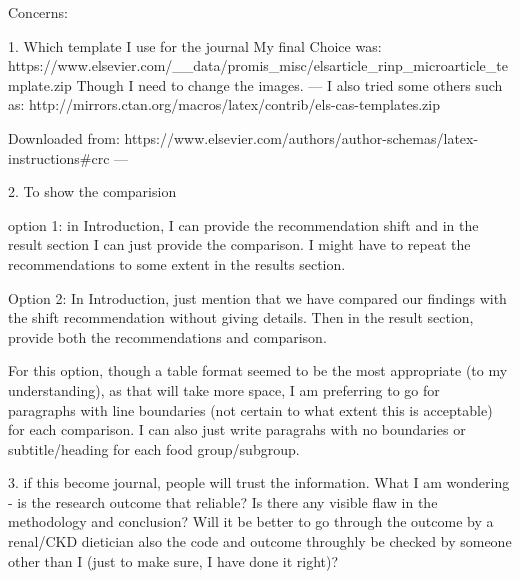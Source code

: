 Concerns:

1. Which template I use for the journal
My final Choice was: https://www.elsevier.com/__data/promis_misc/elsarticle_rinp_microarticle_template.zip
Though I need to change the images.
---
I also tried some others such as:
http://mirrors.ctan.org/macros/latex/contrib/els-cas-templates.zip

Downloaded from:
https://www.elsevier.com/authors/author-schemas/latex-instructions#crc
---

2. To show the comparision

option 1: in Introduction, I can provide the recommendation shift and in the result section I can just provide the comparison. I might have to repeat the recommendations to some extent in the results section.

Option 2: In Introduction, just mention that we have compared our findings with the shift recommendation without giving details. Then in the result section, provide both the recommendations and comparison.

For this option, though a table format seemed to be the most appropriate (to my understanding), as that will take more space, I am preferring to go for paragraphs with line boundaries (not certain to what extent this is acceptable) for each comparison. I can also just write paragrahs with no boundaries or subtitle/heading for each food group/subgroup.

3. if this become journal, people will trust the information. What I am wondering - is the research outcome that reliable? Is there any visible flaw in the methodology and conclusion? Will it be better to go through the outcome by a renal/CKD dietician also the code and outcome throughly be checked by someone other than I (just to make sure, I have done it right)? 